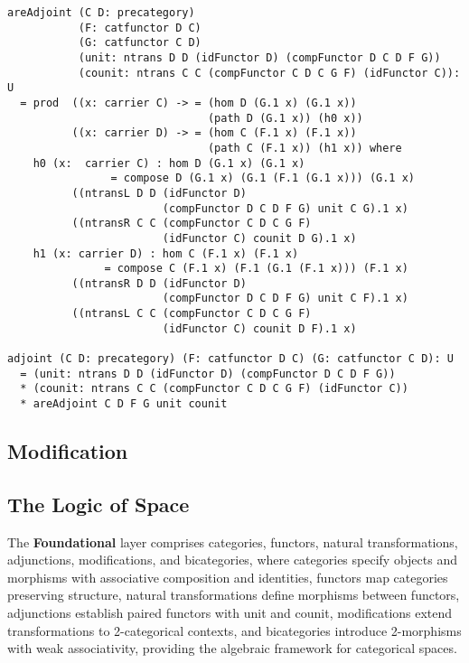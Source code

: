 \documentclass{article}
\begin{document}
\newpage
\begin{lstlisting}
areAdjoint (C D: precategory)
           (F: catfunctor D C)
           (G: catfunctor C D)
           (unit: ntrans D D (idFunctor D) (compFunctor D C D F G))
           (counit: ntrans C C (compFunctor C D C G F) (idFunctor C)): U
  = prod  ((x: carrier C) -> = (hom D (G.1 x) (G.1 x))
                               (path D (G.1 x)) (h0 x))
          ((x: carrier D) -> = (hom C (F.1 x) (F.1 x))
                               (path C (F.1 x)) (h1 x)) where
    h0 (x:  carrier C) : hom D (G.1 x) (G.1 x)
                = compose D (G.1 x) (G.1 (F.1 (G.1 x))) (G.1 x)
          ((ntransL D D (idFunctor D)
                        (compFunctor D C D F G) unit C G).1 x)
          ((ntransR C C (compFunctor C D C G F)
                        (idFunctor C) counit D G).1 x)
    h1 (x: carrier D) : hom C (F.1 x) (F.1 x)
               = compose C (F.1 x) (F.1 (G.1 (F.1 x))) (F.1 x)
          ((ntransR D D (idFunctor D)
                        (compFunctor D C D F G) unit C F).1 x)
          ((ntransL C C (compFunctor C D C G F)
                        (idFunctor C) counit D F).1 x)

adjoint (C D: precategory) (F: catfunctor D C) (G: catfunctor C D): U
  = (unit: ntrans D D (idFunctor D) (compFunctor D C D F G))
  * (counit: ntrans C C (compFunctor C D C G F) (idFunctor C))
  * areAdjoint C D F G unit counit
\end{lstlisting}

\subsection{Modification}

\newpage
\subsection{The Logic of Space}

\hspace{0.5cm}The {\bf Foundational} layer comprises categories, functors, natural transformations, adjunctions, modifications, and bicategories, where categories specify objects and morphisms with associative composition and identities, functors map categories preserving structure, natural transformations define morphisms between functors, adjunctions establish paired functors with unit and counit, modifications extend transformations to 2-categorical contexts, and bicategories introduce 2-morphisms with weak associativity, providing the algebraic framework for categorical spaces.
\end{document}
